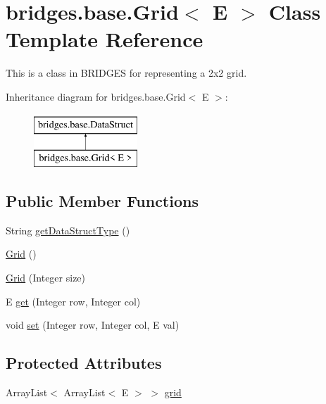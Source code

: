 \hypertarget{classbridges_1_1base_1_1_grid}{}\section{bridges.\+base.\+Grid$<$ E $>$ Class Template Reference}
\label{classbridges_1_1base_1_1_grid}


This is a class in B\+R\+I\+D\+G\+ES for representing a 2x2 grid.  


Inheritance diagram for bridges.\+base.\+Grid$<$ E $>$\+:\begin{figure}[H]
\begin{center}
\leavevmode
\includegraphics[height=2.000000cm]{classbridges_1_1base_1_1_grid}
\end{center}
\end{figure}
\subsection*{Public Member Functions}
\begin{DoxyCompactItemize}
\item 
String \mbox{\hyperlink{classbridges_1_1base_1_1_grid_a81f268dd27c292ff2af9358039d4ebe6}{get\+Data\+Struct\+Type}} ()
\item 
\mbox{\hyperlink{classbridges_1_1base_1_1_grid_aa621ffc958db8341f7ce37ed78944d51}{Grid}} ()
\item 
\mbox{\hyperlink{classbridges_1_1base_1_1_grid_aec6af5e5b69bc26d4de63594cc949bc5}{Grid}} (Integer size)
\item 
E \mbox{\hyperlink{classbridges_1_1base_1_1_grid_a698579bb5b7166f76a18a1b04916e090}{get}} (Integer row, Integer col)
\item 
void \mbox{\hyperlink{classbridges_1_1base_1_1_grid_ab79ceb737423bb28ea2348e61a625a17}{set}} (Integer row, Integer col, E val)
\end{DoxyCompactItemize}
\subsection*{Protected Attributes}
\begin{DoxyCompactItemize}
\item 
Array\+List$<$ Array\+List$<$ E $>$ $>$ \mbox{\hyperlink{classbridges_1_1base_1_1_grid_ad1f3f6968d58188425bd992c05c655a6}{grid}}
\end{DoxyCompactItemize}
